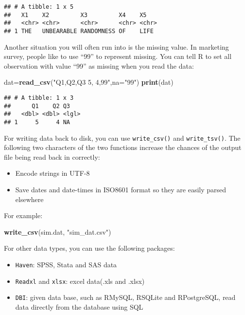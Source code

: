 \documentclass[
]{article}
\newenvironment{Shaded}{\begin{snugshade}}{\end{snugshade}}
\newcommand{\DataTypeTok}[1]{\textcolor[rgb]{0.13,0.29,0.53}{#1}}
\newcommand{\KeywordTok}[1]{\textcolor[rgb]{0.13,0.29,0.53}{\textbf{#1}}}
\newcommand{\NormalTok}[1]{#1}
\newcommand{\StringTok}[1]{\textcolor[rgb]{0.31,0.60,0.02}{#1}}
\providecommand{\tightlist}{%
  \setlength{\itemsep}{0pt}\setlength{\parskip}{0pt}}
\begin{document}
\begin{verbatim}
## # A tibble: 1 x 5
##   X1    X2         X3         X4    X5   
##   <chr> <chr>      <chr>      <chr> <chr>
## 1 THE   UNBEARABLE RANDOMNESS OF    LIFE
\end{verbatim}

Another situation you will often run into is the missing value. In
marketing survey, people like to use ``99'' to represent missing. You
can tell R to set all observation with value ``99'' as missing when you
read the data:

\begin{Shaded}
\begin{Highlighting}[]
\NormalTok{dat=}\KeywordTok{read_csv}\NormalTok{(}\StringTok{"Q1,Q2,Q3}
\StringTok{               5, 4,99"}\NormalTok{,}\DataTypeTok{na=}\StringTok{"99"}\NormalTok{)}
\KeywordTok{print}\NormalTok{(dat)}
\end{Highlighting}
\end{Shaded}

\begin{verbatim}
## # A tibble: 1 x 3
##      Q1    Q2 Q3   
##   <dbl> <dbl> <lgl>
## 1     5     4 NA
\end{verbatim}

For writing data back to disk, you can use \texttt{write\_csv()} and
\texttt{write\_tsv()}. The following two characters of the two functions
increase the chances of the output file being read back in correctly:

\begin{itemize}
\tightlist
\item
  Encode strings in UTF-8
\item
  Save dates and date-times in ISO8601 format so they are easily parsed
  elsewhere
\end{itemize}

For example:

\begin{Shaded}
\begin{Highlighting}[]
\KeywordTok{write_csv}\NormalTok{(sim.dat, }\StringTok{"sim_dat.csv"}\NormalTok{)}
\end{Highlighting}
\end{Shaded}

For other data types, you can use the following packages:

\begin{itemize}
\tightlist
\item
  \texttt{Haven}: SPSS, Stata and SAS data
\item
  \texttt{Readxl} and \texttt{xlsx}: excel data(.xls and .xlsx)
\item
  \texttt{DBI}: given data base, such as RMySQL, RSQLite and
  RPostgreSQL, read data directly from the database using SQL
\end{itemize}
\end{document}
